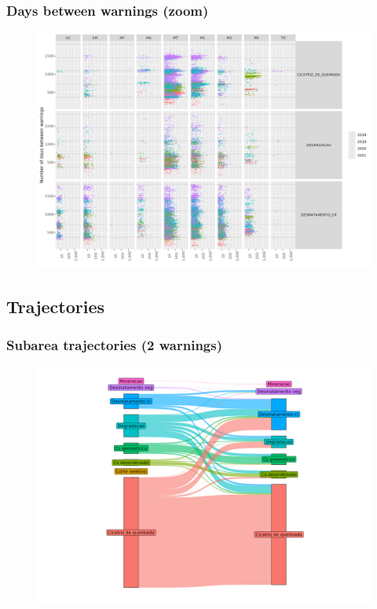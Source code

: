 \documentclass[aspectratio=169]{beamer}
\begin{document}
\begin{frame}
    \frametitle{Days between warnings (zoom)}
    \begin{figure}[h]
        \includegraphics[width=0.75\linewidth]
        {./figures/plot_deter_subarea_density_by_state_first-type_nwarnings_zoom.png}
    \end{figure}
\end{frame}

\subsection{Trajectories}

\begin{frame}
    \frametitle{Subarea trajectories (2 warnings)}
    \begin{figure}[h]
        \includegraphics[width=0.75\linewidth]
        {./figures/plot_deter_subarea_trajectory_2.png}
    \end{figure}
\end{frame}
\end{document}

